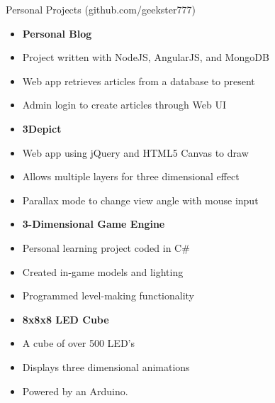 \documentclass{article}
\newcommand{\lineseparator}[1]{\noindent\makebox[\linewidth]{\rule{\textwidth}{#1}}}
\begin{document}
{\Large Personal Projects (github.com/geekster777) } \\ 
\lineseparator{0.5pt}
\vspace{4mm}
\begin{minipage}[t]{0.5\textwidth}
  \vspace{0.5mm}
  \begin{itemize}[leftmargin=4mm]
    \item[] {\bf Personal Blog } \\[-0.5mm]   
    \item[] Project written with NodeJS, AngularJS, and MongoDB \\[-2mm]   
    \item[] Web app retrieves articles from a database to present \\[-2mm]   
    \item[] Admin login to create articles through Web UI \\[2mm]
    \item[] {\bf 3Depict } \\[-0.5mm]   
    \item[] Web app using jQuery and HTML5 Canvas to draw \\[-2mm]   
    \item[] Allows multiple layers for three dimensional effect \\[-2mm]   
    \item[] Parallax mode to change view angle with mouse input 
  \end{itemize}
\end{minipage}
\begin{minipage}[t]{0.5\textwidth}
  \vspace{0.5mm}
  \begin{itemize}[leftmargin=4mm]
    \item[] {\bf 3-Dimensional Game Engine } \\[-0.5mm]   
    \item[] Personal learning project coded in C\# \\[-2mm]   
    \item[] Created in-game models and lighting  \\[-2mm]   
    \item[] Programmed level-making functionality \\[2mm]
    \item[] {\bf 8x8x8 LED Cube } \\[-0.5mm]   
    \item[] A cube of over 500 LED's \\[-2mm]   
    \item[] Displays three dimensional animations \\[-2mm]   
    \item[] Powered by an Arduino. 
  \end{itemize}
\end{minipage}
\end{document}
